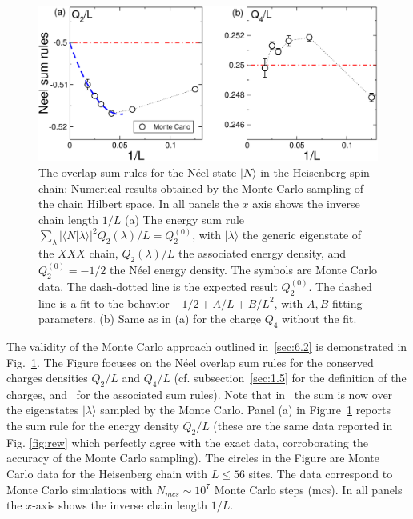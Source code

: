\documentclass[11pt]{iopart}
\begin{document}
\begin{figure}[t]
\begin{center}
\includegraphics[width=.9\textwidth]{QAMC_Obs_Neel}
\end{center}
\caption{The overlap sum rules for the N\'eel state $|N\rangle$ in the 
 Heisenberg spin chain: Numerical results obtained by the Monte Carlo 
 sampling of the chain Hilbert space. In all panels the $x$ axis shows 
 the inverse chain length $1/L$ (a) The energy sum rule $\sum_\lambda|
 \langle N|\lambda\rangle|^2Q_2(\lambda)/L=Q^{(0)}_2$, with $|\lambda
 \rangle$ the generic eigenstate of the $XXX$ chain, $Q_2(\lambda)/L$ 
 the associated energy density, and $Q_2^{(0)}=-1/2$ the N\'eel energy 
 density. The symbols are Monte Carlo data. The dash-dotted line is the 
 expected result $Q_2^{(0)}$. The dashed line is a fit to the behavior 
 $-1/2+A/L+B/L^2$, with $A,B$ fitting parameters.
 (b) Same as in (a) for the charge $Q_4$ without the fit. 
}
\label{fig3:Neel-qamc-sr}
\end{figure}


The validity of the Monte Carlo approach outlined in~\ref{sec:6.2} is demonstrated 
in Fig.~\ref{fig3:Neel-qamc-sr}. The Figure focuses on the N\'eel overlap 
sum rules for the conserved charges densities $Q_2/L$ and $Q_4/L$ (cf. 
subsection~\ref{sec:1.5} for the definition of the charges, and~ 
for the associated sum rules). 
%
Note that in~  the sum is now over the 
eigenstates $|\lambda\rangle$ sampled by the Monte Carlo. 
Panel (a) in Figure~\ref{fig3:Neel-qamc-sr} reports the sum rule for 
the energy density $Q_2/L$ (these are the same data reported in Fig. \ref{fig:rew} which 
perfectly agree with the exact data, corroborating the accuracy of the Monte Carlo sampling). 
The circles in the Figure are Monte Carlo data for the Heisenberg chain with $L\le 56$ 
sites. The data correspond to Monte Carlo simulations with $N_{mcs}\sim 10^7$ Monte 
Carlo steps (mcs). In all panels the $x$-axis shows the inverse chain length $1/L$. 
\end{document}
